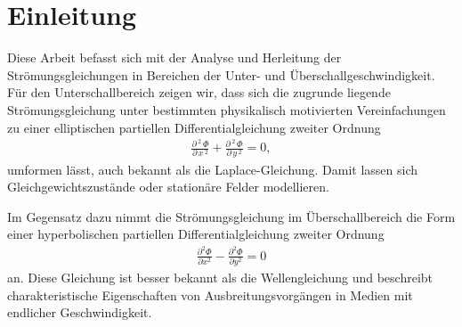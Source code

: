 %
%
%
%
\section{Einleitung\label{ueberschall:Einleitung}}
Diese Arbeit befasst sich mit der Analyse und Herleitung 
der Strömungsgleichungen in Bereichen der
Unter- und Überschallgeschwindigkeit. 
Für den Unterschallbereich zeigen wir, 
dass sich die zugrunde liegende Strömungsgleichung 
unter bestimmten physikalisch motivierten 
Vereinfachungen zu einer elliptischen 
partiellen Differentialgleichung zweiter Ordnung 
\begin{align*}
    \frac{\partial\,^2\,\Phi}{\partial\,x\,^2} 
    +
    \frac{\partial\,^2\,\Phi}{\partial\,y\,^2} 
    = 
    0, 
\end{align*}
umformen lässt,
auch bekannt als die Laplace-Gleichung.
Damit lassen sich Gleichgewichtszustände oder
stationäre Felder modellieren.

Im Gegensatz dazu nimmt die Strömungsgleichung 
im Überschallbereich die Form einer hyperbolischen 
partiellen Differentialgleichung zweiter Ordnung
\begin{align}
\frac{\partial^2 \Phi}{\partial x^2}
- 
\frac{\partial^2 \Phi}{\partial y^2} 
= 
0\label{eq:wellengleichung}
\end{align}
an.
Diese Gleichung ist besser bekannt als die Wellengleichung 
und beschreibt charakteristische Eigenschaften 
von Ausbreitungsvorgängen in Medien mit endlicher 
Geschwindigkeit.

